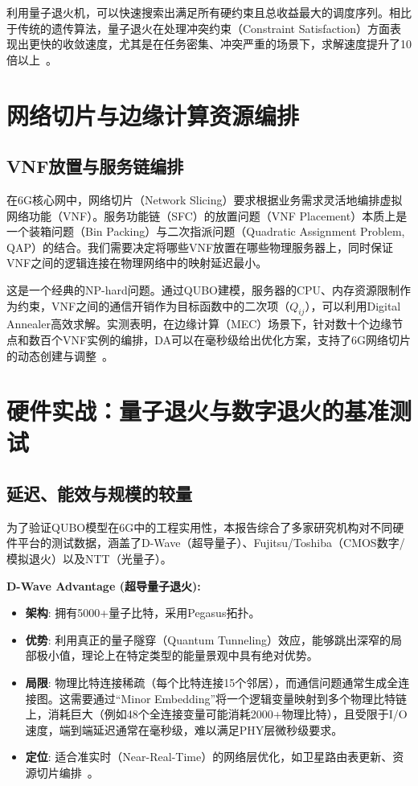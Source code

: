 \documentclass[12pt,a4paper]{article}
\begin{document}
利用量子退火机，可以快速搜索出满足所有硬约束且总收益最大的调度序列。相比于传统的遗传算法，量子退火在处理冲突约束（Constraint Satisfaction）方面表现出更快的收敛速度，尤其是在任务密集、冲突严重的场景下，求解速度提升了10倍以上~\cite{ref42}。


\section{网络切片与边缘计算资源编排}

\subsection{VNF放置与服务链编排}

在6G核心网中，网络切片（Network Slicing）要求根据业务需求灵活地编排虚拟网络功能（VNF）。服务功能链（SFC）的放置问题（VNF Placement）本质上是一个装箱问题（Bin Packing）与二次指派问题（Quadratic Assignment Problem, QAP）的结合。我们需要决定将哪些VNF放置在哪些物理服务器上，同时保证VNF之间的逻辑连接在物理网络中的映射延迟最小。

这是一个经典的NP-hard问题。通过QUBO建模，服务器的CPU、内存资源限制作为约束，VNF之间的通信开销作为目标函数中的二次项（$Q_{ij}$），可以利用Digital Annealer高效求解。实测表明，在边缘计算（MEC）场景下，针对数十个边缘节点和数百个VNF实例的编排，DA可以在毫秒级给出优化方案，支持了6G网络切片的动态创建与调整~\cite{ref45}。


\section{硬件实战：量子退火与数字退火的基准测试}

\subsection{延迟、能效与规模的较量}

为了验证QUBO模型在6G中的工程实用性，本报告综合了多家研究机构对不同硬件平台的测试数据，涵盖了D-Wave（超导量子）、Fujitsu/Toshiba（CMOS数字/模拟退火）以及NTT（光量子）。

\textbf{D-Wave Advantage (超导量子退火):}
\begin{itemize}
    \item \textbf{架构}: 拥有5000+量子比特，采用Pegasus拓扑。
    \item \textbf{优势}: 利用真正的量子隧穿（Quantum Tunneling）效应，能够跳出深窄的局部极小值，理论上在特定类型的能量景观中具有绝对优势。
    \item \textbf{局限}: 物理比特连接稀疏（每个比特连接15个邻居），而通信问题通常生成全连接图。这需要通过``Minor Embedding''将一个逻辑变量映射到多个物理比特链上，消耗巨大（例如48个全连接变量可能消耗2000+物理比特），且受限于I/O速度，端到端延迟通常在毫秒级，难以满足PHY层微秒级要求。
    \item \textbf{定位}: 适合准实时（Near-Real-Time）的网络层优化，如卫星路由表更新、资源切片编排~\cite{ref12}。
\end{itemize}
\end{document}
